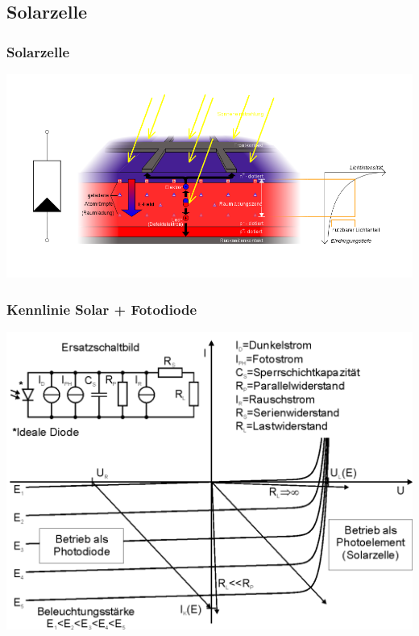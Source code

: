 \subsection*{Solarzelle}
\begin{frame}
  \frametitle{Solarzelle}
  \begin{center}
    \includegraphics[width=1\textwidth,height=.85\textheight,keepaspectratio]{a05/Solarzelle_Funktionsprinzip2.png}\\
    \tiny \hyperlink{refs}{\cite{wm}}
  \end{center}
\end{frame}

\begin{frame}
  \frametitle{Kennlinie Solar + Fotodiode}
  \begin{center}
    \includegraphics[width=1\textwidth,height=.85\textheight,keepaspectratio]{a05/Kennlinie_Photodiode_1.png}\\
    \tiny \hyperlink{refs}{\cite{wm}}
  \end{center}
\end{frame}

